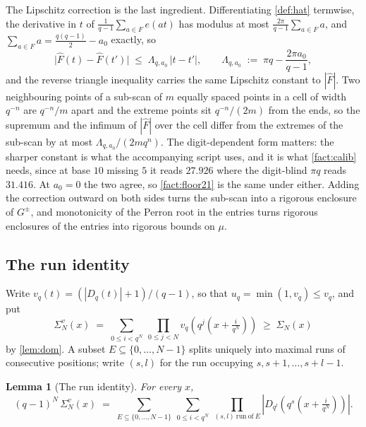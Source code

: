 \documentclass[11pt]{amsart}
\newtheorem{lemma}[theorem]{Lemma}
\theoremstyle{definition}
\theoremstyle{remark}
\begin{document}
The Lipschitz correction is the last ingredient. Differentiating \cref{def:hat} termwise, the derivative in $t$ of $\frac{1}{q-1}\sum_{a \in F} e(at)$ has modulus at most $\frac{2\pi}{q-1}\sum_{a \in F} a$, and $\sum_{a \in F} a = \frac{q(q-1)}{2} - a_{0}$ exactly, so
\begin{equation}
\label{eq:lip}
  \bigl|\widehat{F}(t) - \widehat{F}(t')\bigr| \;\le\; \Lambda_{q,a_{0}}\,|t-t'|, \qquad
  \Lambda_{q,a_{0}} \;:=\; \pi q - \frac{2\pi a_{0}}{q-1},
\end{equation}
and the reverse triangle inequality carries the same Lipschitz constant to $|\widehat{F}|$.
Two neighbouring points of a sub-scan of $m$ equally spaced points in a cell of width $q^{-n}$ are $q^{-n}/m$ apart and the extreme points sit $q^{-n}/(2m)$ from the ends, so the supremum and the infimum of $|\widehat{F}|$ over the cell differ from the extremes of the sub-scan by at most $\Lambda_{q,a_{0}}/(2mq^{n})$. The digit-dependent form matters: the sharper constant is what the accompanying script uses, and it is what \cref{fact:calib} needs, since at base $10$ missing $5$ it reads $27.926$ where the digit-blind $\pi q$ reads $31.416$. At $a_{0} = 0$ the two agree, so \cref{fact:floor21} is the same under either. Adding the correction outward on both sides turns the sub-scan into a rigorous enclosure of $G^{\pm}$, and monotonicity of the Perron root in the entries turns rigorous enclosures of the entries into rigorous bounds on $\mu$.

\subsection{The run identity}

Write $v_{q}(t) = (|D_{q}(t)|+1)/(q-1)$, so that $u_{q} = \min(1, v_{q}) \le v_{q}$, and put
\[
  \Sigma^{v}_{N}(x) \;=\; \sum_{0 \le i < q^{N}}\ \prod_{0 \le j < N} v_{q}\!\left(q^{j}\!\left(x + \tfrac{i}{q^{N}}\right)\right) \; \ge \; \Sigma_{N}(x)
\]
by \cref{lem:dom}. A subset $E \subseteq \{0,\dots,N-1\}$ splits uniquely into maximal runs of consecutive positions; write $(s, l)$ for the run occupying $s, s+1, \dots, s+l-1$.

\begin{lemma}[The run identity]
\label{lem:runs}
For every $x$,
\[
  (q-1)^{N}\,\Sigma^{v}_{N}(x) \;=\; \sum_{E \subseteq \{0,\dots,N-1\}}\ \sum_{0 \le i < q^{N}}\ \prod_{(s,l)\ \mathrm{run\ of}\ E} \left|D_{q^{l}}\!\left(q^{s}\!\left(x + \tfrac{i}{q^{N}}\right)\right)\right| .
\]
\end{lemma}
\end{document}
